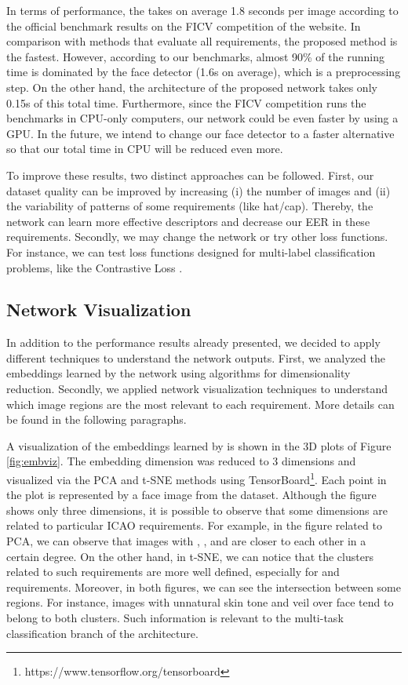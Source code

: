 In terms of performance, the \methodname takes on average 1.8 seconds per image according to the official benchmark results on the FICV competition of the \fvcongoing website. In comparison with methods that evaluate all requirements, the proposed method is the fastest. However, according to our benchmarks, almost 90\% of the \methodname running time is dominated by the face detector (1.6s on average), which is a preprocessing step. On the other hand, the architecture of the proposed network takes only 0.15s of this total time. Furthermore, since the FICV competition runs the benchmarks in CPU-only computers, our network could be even faster by using a GPU. In the future, we intend to change our face detector to a faster alternative so that our total time in CPU will be reduced even more.

To improve these results, two distinct approaches can be followed. First, our dataset quality can be improved by increasing (i) the number of images and (ii) the variability of patterns of some requirements (like hat/cap). Thereby, the network can learn more effective descriptors and decrease our EER in these requirements. Secondly, we may change the network or try other loss functions. For instance, we can test loss functions designed for multi-label classification problems, like the Contrastive Loss \citep{khosla2020supervised}.

\subsection{Network Visualization} \label{sec:netviz}

In addition to the performance results already presented, we decided to apply different techniques to understand the network outputs. First, we analyzed the embeddings learned by the network using algorithms for dimensionality reduction. Secondly, we applied network visualization techniques to understand which image regions are the most relevant to each requirement. More details can be found in the following paragraphs.

A visualization of the embeddings learned by \methodname is shown in the 3D plots of Figure \ref{fig:embviz}. The embedding dimension was reduced to 3 dimensions and visualized via the PCA and t-SNE methods using TensorBoard\footnote{https://www.tensorflow.org/tensorboard}. Each point in the plot is represented by a face image from the dataset. Although the figure shows only three dimensions, it is possible to observe that some dimensions are related to particular ICAO requirements. For example, in the figure related to PCA, we can observe that images with \variedbackground, \unnaturalskintone, and \veiloverface are closer to each other in a certain degree. On the other hand, in t-SNE, we can notice that the clusters related to such requirements are more well defined, especially for \variedbackground and \veiloverface requirements. Moreover, in both figures, we can see the intersection between some regions. For instance, images with unnatural skin tone and veil over face tend to belong to both clusters. Such information is relevant to the multi-task classification branch of the \methodname architecture. 

